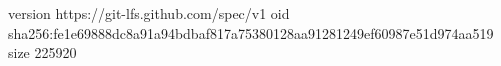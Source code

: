version https://git-lfs.github.com/spec/v1
oid sha256:fe1e69888dc8a91a94bdbaf817a75380128aa91281249ef60987e51d974aa519
size 225920
